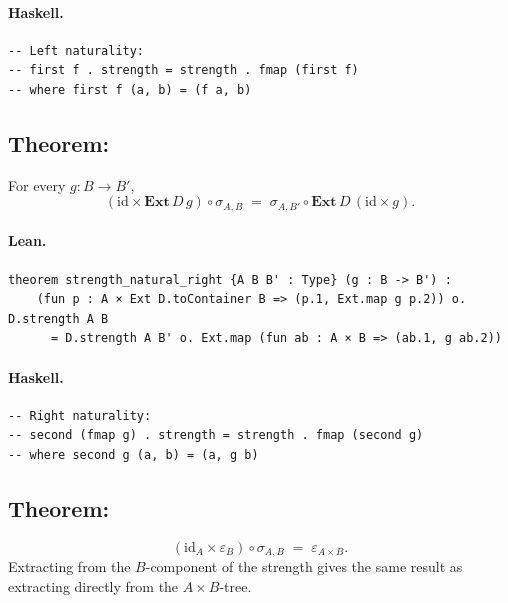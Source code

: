 \documentclass[11pt,a4paper]{article}
\begin{document}
\paragraph{Haskell.}
\begin{lstlisting}[style=haskell]
-- Left naturality:
-- first f . strength = strength . fmap (first f)
-- where first f (a, b) = (f a, b)
\end{lstlisting}


\subsection{Theorem: }

\begin{thm}
For every $g : B \to B'$,
\[
  (\mathrm{id} \times \mathbf{Ext}\,D\,g) \circ \sigma_{A,B}
  \;=\;
  \sigma_{A,B'} \circ \mathbf{Ext}\,D\,(\mathrm{id} \times g).
\]
\end{thm}

\paragraph{Lean.}
\begin{lstlisting}[style=lean]
theorem strength_natural_right {A B B' : Type} (g : B -> B') :
    (fun p : A × Ext D.toContainer B => (p.1, Ext.map g p.2)) o. D.strength A B
      = D.strength A B' o. Ext.map (fun ab : A × B => (ab.1, g ab.2))
\end{lstlisting}

\paragraph{Haskell.}
\begin{lstlisting}[style=haskell]
-- Right naturality:
-- second (fmap g) . strength = strength . fmap (second g)
-- where second g (a, b) = (a, g b)
\end{lstlisting}


\subsection{Theorem: }

\begin{thm}
\[
  (\mathrm{id}_A \times \varepsilon_B) \circ \sigma_{A,B}
  \;=\;
  \varepsilon_{A \times B}.
\]
Extracting from the $B$-component of the strength gives the same result as
extracting directly from the $A \times B$-tree.
\end{thm}
\end{document}
